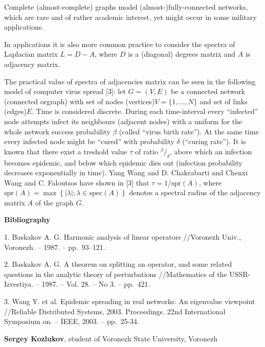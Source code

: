 \documentclass[11pt]{article}
\begin{document}
Complete (almost-complete) graphs model (almost-)fully-connected networks,
which are rare and of rather academic interest,
yet might occur in some military applications.

In applications it is also more common practice to consider
the spectra of Laplacian matrix \( L = D - A \),
where \( D \) is a (diagonal) degrees matrix
and \( A \) is adjacency matrix.

The practical value of spectra of adjacencies matrix
can be seen in the following model of computer virus spread [3]:
let \( G = (V, E) \) be a connected network (connected orgraph)
with set of nodes (vertices)\( V = \{1, \ldots, N\} \)
and set of links (edges)\( E \).
Time is considered discrete.
During each time-interval every ``infected'' node
attempts infect its neighbours (adjacent nodes)
with a uniform for the whole network success probability \( \beta \) (called ``virus birth rate'').
At the same time every infected node might be ``cured'' with probability \( \delta \) (``curing rate'').
It is known that there exist a treshold value \( \tau \) of ratio \( {^\beta}/_{\delta} \),
above which an infection becomes epidemic,
and below which epidemic dies out (infection probability decreases exponentially in time).
Yang Wang and D. Chakrabarti and Chenxi Wang and C. Faloutsos have shown in [3]
that \( \tau = 1/\mathrm{spr}\left({A}\right) \),
where \( \mathrm{spr}\left({A}\right) = \max\left\{\lvert \lambda\rvert; \lambda\in\mathrm{spec}\left(A\right) \right\} \)
denotes a spectral radius of the adjacency matrix \( A \) of the graph \( G \).

\centerline{\textbf{Bibliography}}

1. Baskakov A. G. Harmonic analysis of linear operators //Voronezh Univ., Voronezh. – 1987. -- pp.~93--121.

2. Baskakov A. G. A theorem on splitting an operator, and some related questions in the analytic theory of perturbations
   //Mathematics of the USSR-Izvestiya. – 1987. – Vol. 28. – No 3. – pp.~421.

3. Wang Y. et al. Epidemic spreading in real networks: An eigenvalue viewpoint
   //Reliable Distributed Systems, 2003. Proceedings. 22nd International Symposium on. – IEEE, 2003. – pp.~25-34.



{\bf Sergey Kozlukov}, student of Voronezh State University, Voronezh
\end{document}
